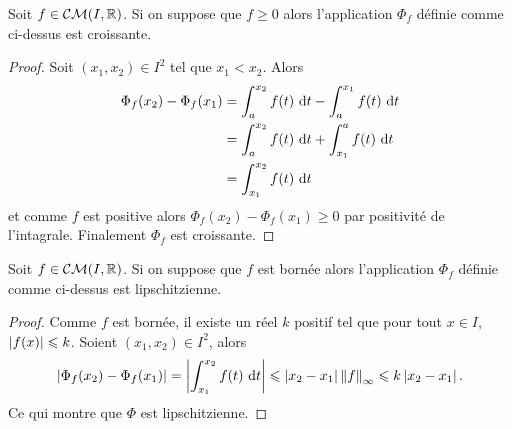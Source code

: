 \begin{prop}
  Soit \(f \in \mathcal{CM}(I,\mathbb{R})\). Si on suppose que \(f \geqslant 0\) alors l'application \(\Phi_f\) définie comme ci-dessus est croissante.
\end{prop}
\begin{proof}
  Soit \((x_1,x_2)\in I^2\) tel que \(x_1<x_2\). Alors
  \begin{align}
    \Phi_f(x_2)-\Phi_f(x_1) &= \int_a^{x_2} f(t)\,\mathop{}\mathopen{}\mathrm{d} t - \int_a^{x_1} f(t)\,\mathop{}\mathopen{}\mathrm{d} t \\
    &= \int_a^{x_2} f(t)\,\mathop{}\mathopen{}\mathrm{d} t + \int_{x_1}^a f(t)\,\mathop{}\mathopen{}\mathrm{d} t \\
    &= \int_{x_1}^{x_2} f(t)\,\mathop{}\mathopen{}\mathrm{d} t
  \end{align}
  et comme \(f\) est positive alors \(\Phi_f(x_2)-\Phi_f(x_1) \geqslant 0\) par positivité de l'intagrale. Finalement \(\Phi_f\) est croissante.
\end{proof}

\begin{prop}
  Soit \(f \in \mathcal{CM}(I,\mathbb{R})\). Si on suppose que \(f\) est bornée alors l'application \(\Phi_f\) définie comme ci-dessus est lipschitzienne. 
\end{prop}
\begin{proof}
  Comme \(f\) est bornée, il existe un réel \(k\) positif tel que pour tout \(x \in I\), \(\left\lvert f(x)\right\rvert\leqslant k\). Soient \((x_1,x_2) \in I^2\), alors
  \begin{equation}
    \left\lvert\Phi_f(x_2)-\Phi_f(x_1)\right\rvert = \left\lvert\int_{x_1}^{x_2} f(t)\,\mathop{}\mathopen{}\mathrm{d} t\right\rvert \leqslant \left\lvert x_2-x_1\right\rvert \left\lVert f\right\rVert_{\infty} \leqslant k \left\lvert x_2 -x_1\right\rvert.
  \end{equation}
  Ce qui montre que \(\Phi\) est lipschitzienne. 
\end{proof}

